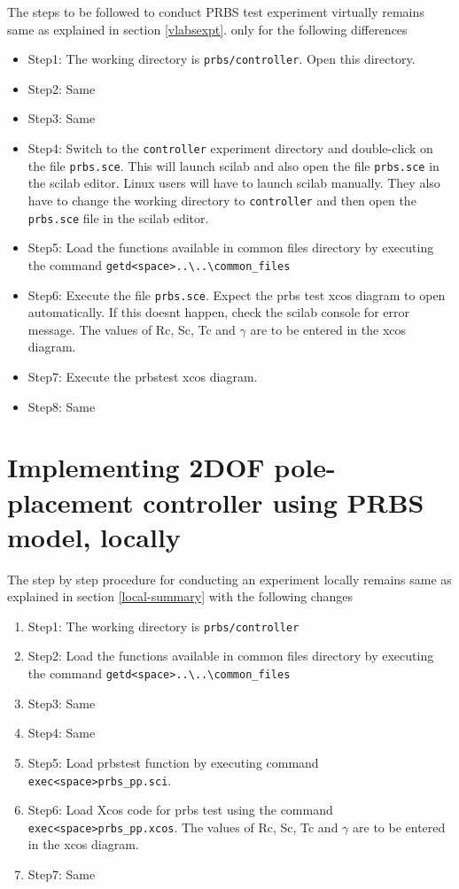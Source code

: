 The steps to be followed to conduct PRBS test experiment virtually remains same as explained in section \ref{vlabsexpt}. only for the following differences
\begin{itemize}
\item Step1: The working directory is {\tt prbs/controller}. Open this directory.
\item Step2: Same
\item Step3: Same
\item Step4:  Switch to the {\tt controller} experiment directory and double-click on the file {\tt prbs.sce}. This will launch scilab and also open the file {\tt prbs.sce} in the scilab editor. Linux users will have to launch scilab manually. They also have to change the working directory to {\tt controller} and then open the {\tt  prbs.sce} file in the scilab editor.
\item Step5:  Load the functions available in common files directory by executing the command {\tt getd<space>..\textbackslash ..\textbackslash common\_files\ }
\item Step6: Execute the file {\tt prbs.sce}.  Expect the prbs test xcos diagram to open automatically. If this doesnt happen, check the scilab console for error message. The values of Rc, Sc, Tc and $\gamma$ are to be entered in the xcos diagram.
\item Step7: Execute the prbstest xcos diagram.
\item Step8: Same
\end{itemize}

\section{Implementing 2DOF pole-placement controller using PRBS model, locally}
The step by step procedure for conducting an experiment locally remains same as explained in section \ref{local-summary} with the following changes
\begin{enumerate}
\item Step1: The working directory is {\tt  prbs/controller}
\item Step2:  Load the functions available in common files directory by executing the command {\tt getd<space>..\textbackslash ..\textbackslash common\_files\ }
\item Step3: Same
\item Step4: Same
\item Step5: Load prbstest function by executing command\\ {\tt exec<space>prbs\_pp.sci}.
\item Step6: Load Xcos code for prbs test using the command\\ {\tt exec<space>prbs\_pp.xcos}.  The values of Rc, Sc, Tc and $\gamma$ are to be entered in the xcos diagram.
\item Step7: Same
\end{enumerate}

